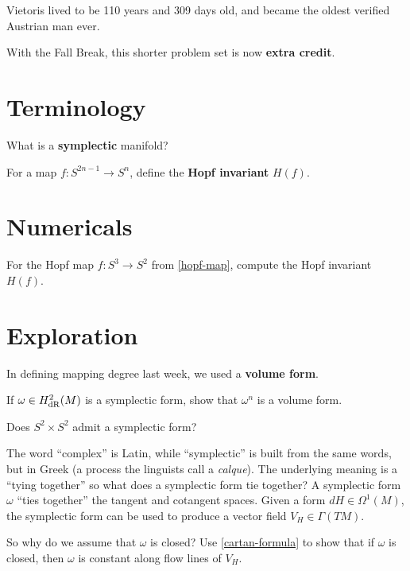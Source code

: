 \documentclass{homework}
\author{Jim Fowler}
\begin{document}
\maketitle

\begin{inspiration}
  Vietoris lived to be 110 years and 309 days old, and became the oldest verified Austrian man ever.
\end{inspiration}

With the Fall Break, this shorter problem set is now \textbf{extra
credit}.

\section{Terminology}

\begin{problem}\label{symplectic-definition}What is a \textbf{symplectic} manifold?
\end{problem}

\begin{problem}
 For a map $f : S^{2n-1} \to S^n$, define the \textbf{Hopf invariant} $H(f)$.
\end{problem}

\section{Numericals}

\begin{problem}
For the Hopf map $f : S^3 \to S^2$ from \ref{hopf-map}, compute the Hopf invariant $H(f)$.
\end{problem}

\section{Exploration}

\begin{problem}
  In defining mapping degree last week, we used a \textbf{volume form}.

  If $\omega \in H_{\operatorname{dR}}^2(M)$ is a symplectic form, show that $\omega^n$ is a volume form.
  \end{problem}

  \begin{problem}
  Does $S^2 \times S^2$ admit a symplectic form?
\end{problem}

\begin{problem} The word ``complex'' is Latin, while ``symplectic'' is
built from the same words, but in Greek (a process the linguists call
a \textit{calque}).  The underlying meaning is a ``tying together'' so
what does a symplectic form tie together?  A symplectic form $\omega$
``ties together'' the tangent and cotangent spaces.  Given a form $dH
\in \Omega^1(M)$, the symplectic form can be used to produce a vector
field $V_H \in \Gamma(TM)$.

So why do we assume that $\omega$ is closed?  Use \ref{cartan-formula}
to show that if $\omega$ is closed, then $\omega$ is constant along
flow lines of $V_H$.
\end{problem}
\end{document}
